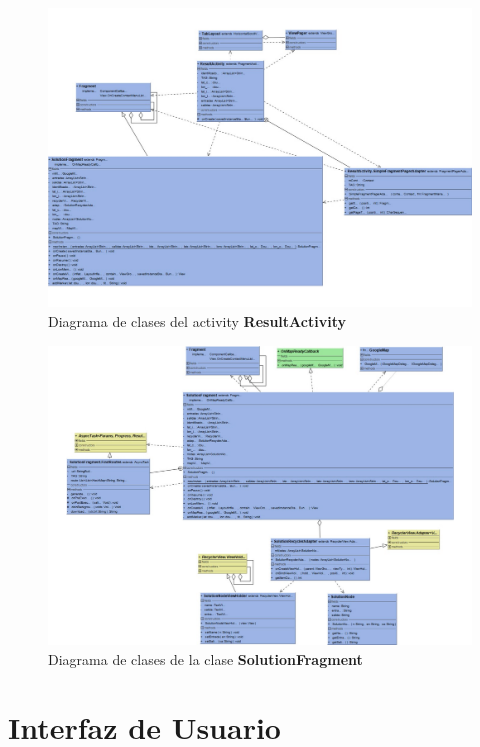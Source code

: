 \begin{figure}[H]
	\centering
	\label{fig:result_activity_diagram}
	\includegraphics[scale=0.8,angle=90]{imagenes/result_activity.pdf}
	\caption{Diagrama de clases del activity \textbf{ResultActivity}}
\end{figure}
\begin{figure}[H]
	\centering
	\label{fig:solution_recycler_diagram}
	\includegraphics[scale=0.8,angle=90]{imagenes/result_fragment.pdf}
	\caption{Diagrama de clases de la clase \textbf{SolutionFragment}}
\end{figure}


\section[Interfaz de Usuario]{Interfaz de Usuario}

